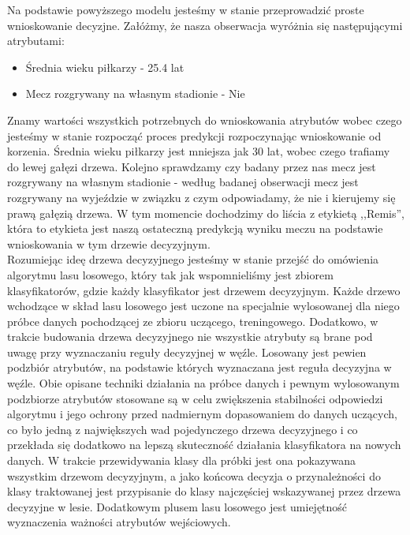 Na podstawie powyższego modelu jesteśmy w stanie przeprowadzić proste wnioskowanie decyzjne. Załóżmy, że nasza obserwacja wyróżnia się następującymi atrybutami:
\begin{itemize}
    \item Średnia wieku piłkarzy - 25.4 lat
    \item Mecz rozgrywany na własnym stadionie - Nie
\end{itemize}
Znamy wartości wszystkich potrzebnych do wnioskowania atrybutów wobec czego jesteśmy w stanie rozpocząć proces predykcji rozpoczynając wnioskowanie od korzenia. Średnia wieku piłkarzy jest mniejsza jak 30 lat, wobec czego trafiamy do lewej gałęzi drzewa. Kolejno sprawdzamy czy badany przez nas mecz jest rozgrywany na własnym stadionie - według badanej obserwacji mecz jest rozgrywany na wyjeździe w związku z czym odpowiadamy, że nie i kierujemy się prawą gałęzią drzewa. W tym momencie dochodzimy do liścia z etykietą ,,Remis'', która to etykieta jest naszą ostateczną predykcją wyniku meczu na podstawie wnioskowania w tym drzewie decyzyjnym.\\

Rozumiejąc ideę drzewa decyzyjnego jesteśmy w stanie przejść do omówienia algorytmu lasu losowego, który tak jak wspomnieliśmy jest zbiorem klasyfikatorów, gdzie każdy klasyfikator jest drzewem decyzyjnym. Każde drzewo wchodzące w skład lasu losowego jest uczone na specjalnie wylosowanej dla niego próbce danych pochodzącej ze zbioru uczącego, treningowego. Dodatkowo, w trakcie budowania drzewa decyzyjnego nie wszystkie atrybuty są brane pod uwagę przy wyznaczaniu reguły decyzyjnej w węźle. Losowany jest pewien podzbiór atrybutów, na podstawie których wyznaczana jest reguła decyzyjna w węźle. Obie opisane techniki działania na próbce danych i pewnym wylosowanym podzbiorze atrybutów stosowane są w celu zwiększenia stabilności odpowiedzi algorytmu i jego ochrony przed nadmiernym dopasowaniem do danych uczących, co było jedną z największych wad pojedynczego drzewa decyzyjnego i co przekłada się dodatkowo na lepszą skuteczność działania klasyfikatora na nowych danych. W trakcie przewidywania klasy dla próbki jest ona pokazywana wszystkim drzewom decyzyjnym, a jako końcowa decyzja o przynależności do klasy traktowanej jest przypisanie do klasy najczęściej wskazywanej przez drzewa decyzyjne w lesie. Dodatkowym plusem lasu losowego jest umiejętność wyznaczenia ważności atrybutów wejściowych. \cite{PPlonski}\\

